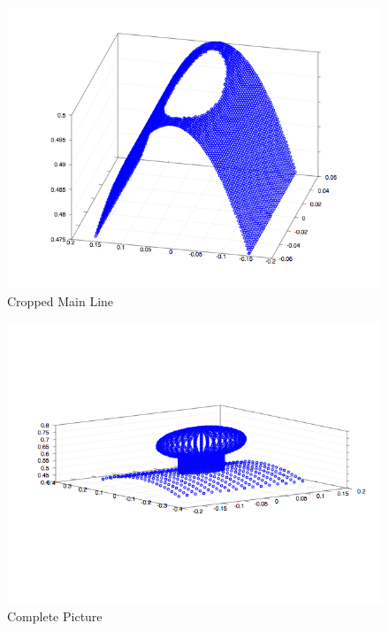 \documentclass[a4paper,10pt]{article}
\begin{document}
\begin{figure}
  \centering
    \includegraphics[scale=0.5]{cropped_main_line}
  \caption{Cropped Main Line}
  \label{fig:1d}
\end{figure}

\begin{figure}
  \centering
    \includegraphics[scale=0.5]{whole_phenomenon.png}
  \caption{Complete Picture}
  \label{fig:1e}
\end{figure}
\end{document}
